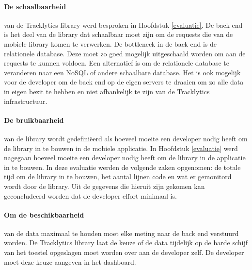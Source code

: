 \paragraph{De schaalbaarheid} van de Tracklytics library werd besproken in Hoofdstuk \ref{evaluatie}. De back end is het deel van de library dat schaalbaar moet zijn om de requests die van de mobiele library komen te verwerken. De bottleneck in de back end is de relationele database. Deze moet zo goed mogelijk uitgeschaald worden om aan de requests te kunnen voldoen. Een alternatief is om de relationele database te veranderen naar een NoSQL of andere schaalbare database. Het is ook mogelijk voor de developer om de back end op de eigen servers te draaien om zo alle data in eigen bezit te hebben en niet afhankelijk te zijn van de Tracklytics infrastructuur.\\


\paragraph{De bruikbaarheid} van de library wordt gedefini\"eerd als hoeveel moeite een developer nodig heeft om de library in te bouwen in de mobiele applicatie. In Hoofdstuk \ref{evaluatie} werd nagegaan hoeveel moeite een developer nodig heeft om de library in de applicatie in te bouwen. In deze evaluatie werden de volgende zaken opgenomen: de totale tijd om de library in te bouwen, het aantal lijnen code en wat er gemonitord wordt door de library. Uit de gegevens die hieruit zijn gekomen kan geconcludeerd worden dat de developer effort minimaal is.

\paragraph{Om de beschikbaarheid} van de data maximaal te houden moet elke meting naar de back end verstuurd worden. De Tracklytics library laat de keuze of de data tijdelijk op de harde schijf van het toestel opgeslagen moet worden over aan de developer zelf. De developer moet deze keuze aangeven in het dashboard. \\

